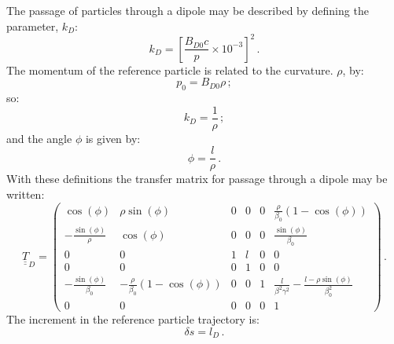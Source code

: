The passage of particles through a dipole may be described by defining
the parameter, $k_D$:
\begin{equation}
  k_D = \left[ \frac{B_{D0} c}{p} \times 10^{-3} \right]^2\,.
  \label{Eq:EffectivekD}
\end{equation}
The momentum of the reference particle is related to the
curvature. $\rho$, by:
\begin{equation}
  p_0 = B_{D0} \rho \, ;
\end{equation}
so:
\begin{equation}
  k_D = \frac{1}{\rho} \, ; 
\end{equation}
and the angle $\phi$ is given by:
\begin{equation}
  \phi = \frac{l}{\rho} \, .
\end{equation}
With these definitions the transfer matrix for passage through a
dipole may be written:
\begin{equation}
  \underline{\underline{T}}_{D} =
    \begin{pmatrix}
                    \cos(\phi) &                                  \rho \sin(\phi) & 0 & 0 & 0 &                 \frac{\rho}{\beta_0}\left(1 - \cos(\phi) \right) \\
      -\frac{\sin(\phi)}{\rho} &                                       \cos(\phi) & 0 & 0 & 0 &                                       \frac{\sin(\phi)}{\beta_0} \\
                             0 &                                                0 & 1 & l & 0 &                                                                0 \\
                             0 &                                                0 & 0 & 1 & 0 &                                                                0 \\
   -\frac{\sin(\phi)}{\beta_0} &  -\frac{\rho}{\beta_0}\left(1 -\cos(\phi)\right) & 0 & 0 & 1 & \frac{l}{\beta^2 \gamma^2} - \frac{l - \rho\sin(\phi)}{\beta_0^2} \\
                             0 &                                                0 & 0 & 0 & 0 &                                                                1
        \end{pmatrix} \, .
\end{equation}
The increment in the reference particle trajectory is:
\begin{equation}
  \delta s = l_D \, .
\end{equation}
